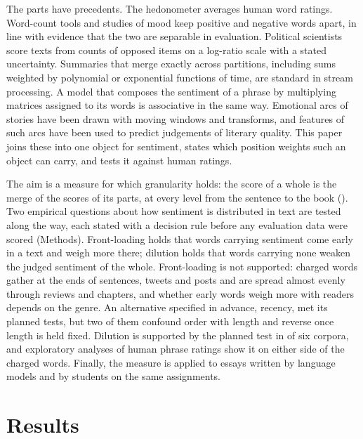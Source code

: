 The parts have precedents. The hedonometer averages human word ratings\cite{dodds2010,dodds2011}. Word-count tools and studies of mood keep positive and negative words apart\cite{tausczik2010,thelwall2010,golder2011}, in line with evidence that the two are separable in evaluation\cite{cacioppo1994}. Political scientists score texts from counts of opposed items on a log-ratio scale with a stated uncertainty\cite{lowe2011,proksch2019}. Summaries that merge exactly across partitions, including sums weighted by polynomial or exponential functions of time, are standard in stream processing\cite{cormode2009,pebay2008,agarwal2013,boykin2014}. A model that composes the sentiment of a phrase by multiplying matrices assigned to its words is associative in the same way\cite{yessenalina2011}. Emotional arcs of stories have been drawn with moving windows and transforms\cite{reagan2016,jockers2015}, and features of such arcs have been used to predict judgements of literary quality\cite{bizzoni2023}. This paper joins these into one object for sentiment, states which position weights such an object can carry, and tests it against human ratings.

The aim is a measure for which granularity holds: the score of a whole is the merge of the scores of its parts, at every level from the sentence to the book (). Two empirical questions about how sentiment is distributed in text are tested along the way, each stated with a decision rule before any evaluation data were scored (Methods). Front-loading holds that words carrying sentiment come early in a text and weigh more there; dilution holds that words carrying none weaken the judged sentiment of the whole. Front-loading is not supported: charged words gather at the ends of sentences, tweets and posts and are spread almost evenly through reviews and chapters, and whether early words weigh more with readers depends on the genre. An alternative specified in advance, recency, met its planned tests, but two of them confound order with length and reverse once length is held fixed. Dilution is supported by the planned test in \winsNoDil{} of six corpora, and exploratory analyses of human phrase ratings show it on either side of the charged words. Finally, the measure is applied to essays written by language models and by students on the same assignments.

\section{Results}

